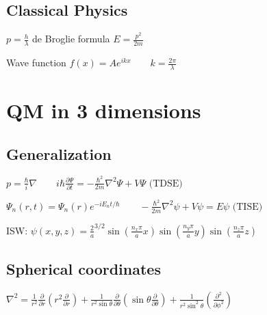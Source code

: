 \documentclass[10pt,a4paper]{scrartcl}
\begin{document}
\begin{multicols*}{3}
	\begin{center}

	\finn
	
	
	\finn
	
	\end{center}

	\subsection{Classical Physics}
	
	$p=\frac{h}{\lambda}$ de Broglie formula \hfill $E=\frac{p^2}{2m}$
	
	Wave function $f(x)=Ae^{ikx}\qquad k=\frac{2\pi}{\lambda}$
	
	\section{QM in 3 dimensions}
	
	\subsection{Generalization}
	
	$p = \frac{\hbar}{i}\nabla\qquad i\hbar\frac{\partial\Psi}{\partial t}=-\frac{\hbar^2}{2m}\nabla^2\Psi+V\Psi \text{ (TDSE)}$
	
	$\Psi_n(r,t)=\Psi_n(r)e^{-iE_nt/\hbar}\qquad -\frac{\hbar^2}{2m}\nabla^2\psi+V\psi=E\psi \text{ (TISE)}$
	
	ISW: $\psi(x,y,z)=\frac{2}{a}^{3/2}\sin(\frac{n_x\pi}{a}x)\sin(\frac{n_y\pi}{a}y)\sin(\frac{n_z\pi}{a}z)$
	
	\subsection{Spherical coordinates}
	
	$\nabla^2=\frac{1}{r^2}\frac{\partial}{\partial r}(r^2\frac{\partial}{\partial r})+\frac{1}{r^2\sin\theta}\frac{\partial}{\partial\theta}(\sin\theta\frac{\partial}{\partial\theta})+\frac{1}{r^2\sin^2\theta}(\frac{\partial^2}{\partial\phi^2})$
	

\end{multicols*}
\end{document}
